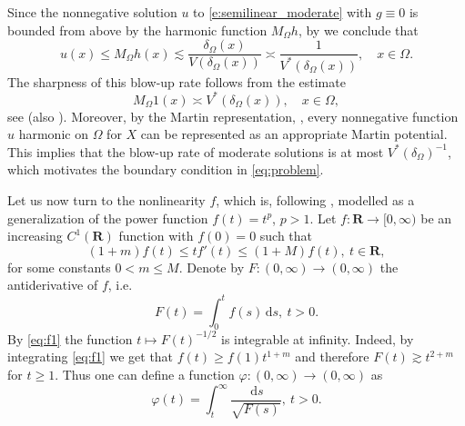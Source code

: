 \documentclass[a4paper,12pt,draft]{article}
\theoremstyle{plain}
\theoremstyle{definition}
\numberwithin{equation}{section}
\newcommand\R{\mathbf{R}}
\renewcommand{\leq}{\leqslant}
\renewcommand{\geq}{\geqslant}
\newcommand{\1}{1}
\newcommand{\ds} {\, \mathrm{d}s}
\begin{document}
Since the nonnegative solution $u$ to \eqref{e:semilinear_moderate} with $g\equiv0$ is bounded from above by the harmonic function $M_\Omega h$, by \cite[(4.18)]{BVW} we conclude that
\begin{equation*}\label{e:blowup_moderate}
u(x)\leq M_\Omega h(x) \lesssim \frac{\delta_\Omega(x)}{V(\delta_\Omega(x))}\asymp \frac{1}{V^*(\delta_\Omega(x))}, \quad x\in \Omega.
\end{equation*}
The sharpness of this blow-up rate follows from the estimate
\begin{equation}\label{e:martin_estimate}
M_\Omega 1 (x) \asymp V^*(\delta_\Omega(x))  , \quad x\in \Omega,
\end{equation}
see \cite[(4.16)]{BVW} (also \cite[(4.19)]{BVW}). Moreover, by the Martin representation, \cite[Proposition 5.11]{Bio}, every nonnegative function $u$ harmonic on $\Omega$ for $X$ can be represented as an appropriate Martin potential. This implies that the blow-up rate of moderate solutions is at most $V^*(\delta_{\Omega})^{-1}$, which motivates the boundary condition in \eqref{eq:problem}.

Let us now turn to the nonlinearity $f$, which is, following \cite{abatangelo2}, modelled as a generalization of the power function $f(t)=t^p$, $p>1$. Let $f:\R\to[0,\infty)$ be an increasing $C^1(\R)$ function with $f(0)=0$ such that
\begin{equation}\label{eq:f1}
(1+m) f(t)\leq tf'(t)\leq (1+M) f(t),\ t\in\R,
\end{equation} 
for some constants $0<m\leq M$. Denote by $F:(0,\infty)\to(0,\infty)$ the antiderivative of $f$, i.e.
\[
F(t)=\int_0^t f(s)\ds,\ t>0.
\]
 By \eqref{eq:f1} the function $t\mapsto F(t)^{-1/2}$ is integrable at infinity.  Indeed, by integrating \eqref{eq:f1} we get that $f(t)\geq f(1) t^{1+m}$ and therefore $F(t)\gtrsim t^{2+m}$ for $t\geq 1$.
Thus one can define a function $\varphi:(0,\infty)\to (0,\infty)$ as
\begin{equation}
\varphi(t)=\int_t^\infty\frac{\ds}{\sqrt{F(s)}}, \ t>0.
\end{equation}
\end{document}
